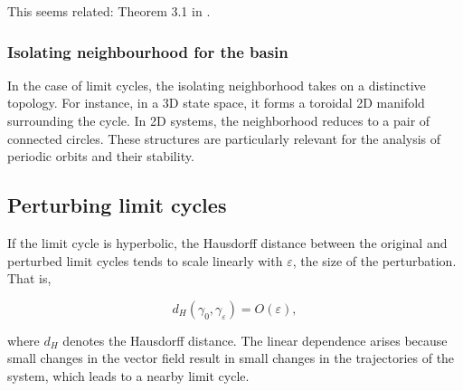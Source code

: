 \documentclass{article}
\newcommand{\cl}{\operatorname{cl}}
\newcommand{\boa}{\operatorname{BoA}}
\newcounter{ct}
\begin{document}
This seems related: Theorem 3.1 in  \citep{butler1986persistence}.


\subsubsection{Isolating neighbourhood for the basin}\label{sec:isonbhd}
\begin{remark}%
In the case of limit cycles, the isolating neighborhood takes on a distinctive topology. For instance, in a 3D state space, it forms a toroidal 2D manifold surrounding the cycle. In 2D systems, the neighborhood reduces to a pair of connected circles. These structures are particularly relevant for the analysis of periodic orbits and their stability.
 \end{remark}


%





\subsection{Perturbing limit cycles}\label{sec:lc_pert}
If the limit cycle is hyperbolic, the Hausdorff distance between the original and perturbed limit cycles tends to scale linearly with \(\varepsilon\), the size of the perturbation. That is,

\[
d_H(\gamma_0, \gamma_\varepsilon) = O(\varepsilon),
\]

where \(d_H\) denotes the Hausdorff distance. The linear dependence arises because small changes in the vector field result in small changes in the trajectories of the system, which leads to a nearby limit cycle.
\end{document}
